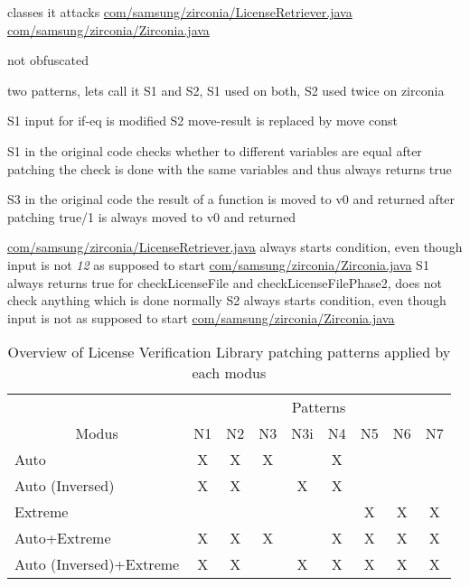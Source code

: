 classes it attacks %
\url{com/samsung/zirconia/LicenseRetriever.java}
\url{com/samsung/zirconia/Zirconia.java}

not obfuscated

two patterns, lets call it S1 and S2, S1 used on both, S2 used twice on zirconia



S1
input for if-eq is modified
S2
move-result is replaced by move const


S1
in the original code checks whether to different variables are equal
after patching the check is done with the same variables and thus always returns true

S3
in the original code the result of a function is moved to v0 and returned
after patching true/1 is always moved to v0 and returned



\url{com/samsung/zirconia/LicenseRetriever.java}
always starts condition, even though input is not \textit{12} as supposed to start
\url{com/samsung/zirconia/Zirconia.java}
S1
always returns true for checkLicenseFile and checkLicenseFilePhase2, does not check anything which is done normally
S2
always starts condition, even though input is not as supposed to start
\url{com/samsung/zirconia/Zirconia.java}
\begin{table}[h]
\centering
\begin{tabular}{l|cccccccc}
                           & \multicolumn{8}{c}{Patterns}           \\
\multicolumn{1}{c|}{Modus} & N1 & N2 & N3 & N3i & N4 & N5 & N6 & N7 \\ \hline
Auto                       & X  & X  & X  &     & X  &    &    &    \\
Auto (Inversed)            & X  & X  &    & X   & X  &    &    &    \\
Extreme                    &    &    &    &     &    & X  & X  & X  \\
Auto+Extreme               & X  & X  & X  &     & X  & X  & X  & X  \\
Auto (Inversed)+Extreme    & X  & X  &    & X   & X  & X  & X  & X
\end{tabular}
\caption{Overview of License Verification Library patching patterns applied by each modus}
\label{table:patterns}
\end{table}



